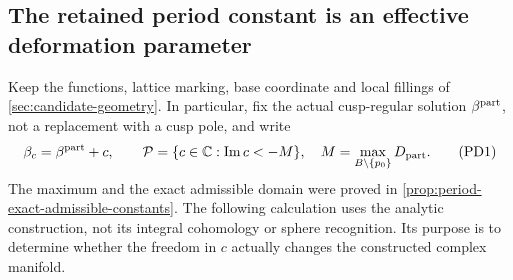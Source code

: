 \subsection{The retained period constant is an effective deformation parameter}
\label{sec:retained-period-deformation}

Keep the functions, lattice marking, base coordinate and local fillings of
\cref{sec:candidate-geometry}. In particular, fix the actual cusp-regular
solution $\beta^{\rm part}$, not a replacement with a cusp pole, and write
\[
 \beta_c=\beta^{\rm part}+c,\qquad
 \mathcal P=\{c\in\mathbb C:\operatorname{Im}c<-M\},
 \quad M=\max_{B\setminus\{p_0\}}D_{\rm part}.
 \tag{PD1}
\]
The maximum and the exact admissible domain were proved in
\cref{prop:period-exact-admissible-constants}. The following calculation
uses the analytic construction, not its integral cohomology or sphere
recognition. Its purpose is to determine whether the freedom in $c$
actually changes the constructed complex manifold.

